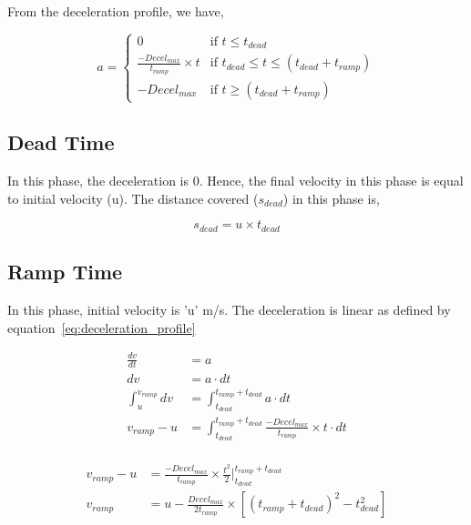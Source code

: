 \documentclass[12pt]{article}
\begin{document}
\noindent From the deceleration profile, we have,

\begin{equation} \label{eq:deceleration_profile}
a = \begin{cases} 0 &\mbox{if } t \le t_{dead} \\
\frac{-Decel_{max}}{t_{ramp}} \times t & \mbox{if } t_{dead} \le t \le (t_{dead} + t_{ramp}) \\
-Decel_{max} & \mbox{if } t \ge (t_{dead} + t_{ramp}) 
\end{cases}
\end{equation}

\subsection{Dead Time}
In this phase, the deceleration is 0. Hence, the final velocity in this phase is equal to initial velocity (u). The distance covered ($s_{dead}$) in this phase is,

\[ s_{dead} = u \times t_{dead} \]

\subsection{Ramp Time}
In this phase, initial velocity is 'u' m/s. The deceleration is linear as defined by equation~\ref{eq:deceleration_profile}

\begin{equation} 
\begin{split}
\frac{dv}{dt} & = a \\
dv & = a \cdot dt \\
\int_{u}^{v_{ramp}}{dv} &= \int_{t_{dead}}^{t_{ramp}+t_{dead}}{a \cdot dt} \\
v_{ramp} - u &= \int_{t_{dead}}^{t_{ramp}+t_{dead}}{\frac{-Decel_{max}}{t_{ramp}} \times t \cdot dt} \\
\end{split}
\end{equation}

\begin{equation}
\begin{split}
v_{ramp} - u &= \frac{-Decel_{max}}{t_{ramp}} \times \frac{t^2}{2}\lvert_{t_{dead}}^{t_{ramp}+t_{dead}} \\
v_{ramp} &= u - \frac{Decel_{max}}{2t_{ramp}} \times [(t_{ramp}+t_{dead})^2 - t_{dead}^2] \\
\end{split}
\end{equation}
\end{document}
